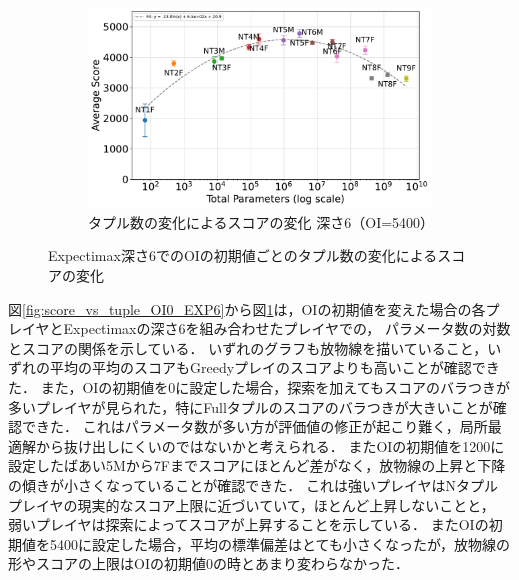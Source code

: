 \begin{figure}[t]
    \vspace{1em}
    \begin{subfigure}[b]{\linewidth}
        \centering
        \includegraphics[width=\linewidth]{pdf/parameter_performance_plots/params_performance_OI5400_EXP6.pdf}
        \caption{タプル数の変化によるスコアの変化 深さ6（OI=5400）}
        \label{fig:score_vs_tuple_OI5400_EXP6}
    \end{subfigure}

    \caption{Expectimax深さ6でのOIの初期値ごとのタプル数の変化によるスコアの変化}
    \label{fig:score_vs_tuple_all_EXP6}
\end{figure}

図\ref{fig:score_vs_tuple_OI0_EXP6}から図\ref{fig:score_vs_tuple_OI5400_EXP6}は，OIの初期値を変えた場合の各プレイヤとExpectimaxの深さ6を組み合わせたプレイヤでの，
パラメータ数の対数とスコアの関係を示している．
いずれのグラフも放物線を描いていること，いずれの平均の平均のスコアもGreedyプレイのスコアよりも高いことが確認できた．
また，OIの初期値を0に設定した場合，探索を加えてもスコアのバラつきが多いプレイヤが見られた，特にFullタプルのスコアのバラつきが大きいことが確認できた．
これはパラメータ数が多い方が評価値の修正が起こり難く，局所最適解から抜け出しにくいのではないかと考えられる．
またOIの初期値を1200に設定したばあい5Mから7Fまでスコアにほとんど差がなく，放物線の上昇と下降の傾きが小さくなっていることが確認できた．
これは強いプレイヤはNタプルプレイヤの現実的なスコア上限に近づいていて，ほとんど上昇しないことと，
弱いプレイヤは探索によってスコアが上昇することを示している．
またOIの初期値を5400に設定した場合，平均の標準偏差はとても小さくなったが，放物線の形やスコアの上限はOIの初期値0の時とあまり変わらなかった．

